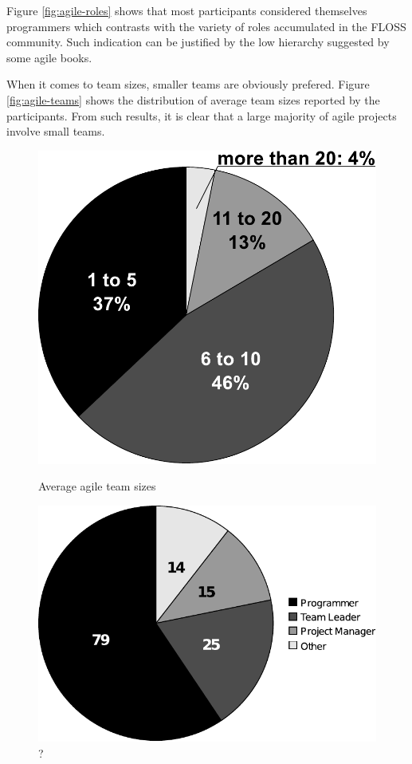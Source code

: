 \documentclass[lnbip]{svmultln}
\begin{document}
Figure \ref{fig:agile-roles} shows that most participants considered
themselves programmers which contrasts with the variety of roles
accumulated in the FLOSS community. Such indication can be justified
by the low hierarchy suggested by some agile books.

When it comes to team sizes, smaller teams are obviously
prefered. Figure \ref{fig:agile-teams} shows the distribution of
average team sizes reported by the participants. From such results, it
is clear that a large majority of agile projects involve small teams.

\begin{figure}[htb]
  \begin{minipage}[t]{0.55\linewidth}
    \centering
    \includegraphics[scale=.3]{agile-teams.pdf}
    \caption{Average agile team sizes}
    \label{fig:agile-teams}
  \end{minipage}
  \begin{minipage}[t]{0.45\linewidth}
    \centering
    \includegraphics[scale=.45]{agile-roles.pdf}
    \caption{?}
    \label{fig:?}
  \end{minipage}
\end{figure}
\end{document}
